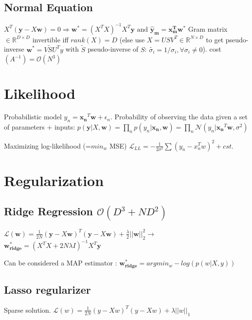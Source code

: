 \subsection{Normal Equation}
$X^T (\mathbf{y} - X\mathbf{w})= 0 \Rightarrow$\newline$\mathbf{w^*} = (X^TX)^{-1}X^T\mathbf{y} \text{ and } \mathbf{\hat{y}_m} = \mathbf{x_m^T} \mathbf{w^*}$
Gram matrix $\in \mathbb{R}^{D\times D}$ invertible iff $rank(X) = D$ (else use $X = USV^T \in \mathbb{R}^{N\times D}$ to get pseudo-inverse $\mathbf{w^*} = V\tilde{S}U^Ty$ with $\tilde{S}$ pseudo-inverse of $S$: $\tilde{\sigma_i} = 1/\sigma_i, \forall \sigma_i \ne 0$). cost$(A^{-1})=\mathcal{O}(N^3)$

\section{Likelihood}
Probabilistic model $y_n = \mathbf{x_n}^T\mathbf{w} + \epsilon_n$.
Probability of observing the data given a set of parameters + inputs:
$p(\mathbf{y}|X, \mathbf{w}) = \prod_n p(y_n|\mathbf{x_n}, \mathbf{w})  = \prod_n \mathcal{N} (y_n | \mathbf{x_n}^T\mathbf{w}, \sigma^2)$

Maximizing log-likelihood (=$min_w$ MSE) $\mathcal{L}_{LL} = -\frac{1}{2\sigma^2} \sum(y_n-x_n^Tw)^2+cst$.


\section{Regularization}
\subsection{Ridge Regression $\mathcal{O}(D^3+ND^2)$}
$\mathcal{L}(\mathbf{w}) = \frac{1}{2N} (\mathbf{y} - X\mathbf{w})^T(\mathbf{y} - X\mathbf{w}) + \frac{\lambda}{2} ||\mathbf{w}||^2_2 \rightarrow$
$\mathbf{w^*_{ridge}} = (X^TX + 2N\lambda I)^{-1}X^T\mathbf{y}$\newline

Can be considered a MAP estimator : $\mathbf{w^*_{ridge}} = arg min_w - log(p(w|X,y))$

\subsection{Lasso regularizer}
Sparse solution.
$\mathcal{L}(w) = \frac{1}{2N} (y - Xw)^T(y - Xw) + \lambda ||w||_1 $

